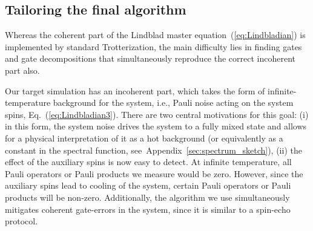 \documentclass[twocolumn,amsmath,amssymb,pra]{revtex4-2}
\begin{document}
\subsection{Tailoring the final algorithm}\label{sec:tailoring_system_bath_physics}
Whereas the coherent part of the Lindblad master equation~(\ref{eq:Lindbladian}) is implemented by standard Trotterization,
the main difficulty lies in finding gates and gate decompositions that simultaneously reproduce the correct incoherent part also.

Our target simulation has an incoherent part, which takes the form of infinite-temperature background for the system, i.e., Pauli noise acting on the system spins, Eq.~(\ref{eq:Lindbladian3}).
There are two central motivations for this goal:
(i) in this form, the system noise drives the system to a fully mixed state and allows for
a physical interpretation of it as a hot background (or equivalently as a constant in the spectral function, see~Appendix~\ref{sec:spectrum_sketch}),
(ii) the effect of the auxiliary spins is now easy to detect. At infinite temperature, all Pauli operators or Pauli products we measure would be zero.
However, since the auxiliary spins lead to cooling of the system, certain Pauli operators or Pauli products will be non-zero.
Additionally, the algorithm we use simultaneously mitigates coherent gate-errors in the system, since it is similar to 
a spin-echo protocol.
\end{document}
